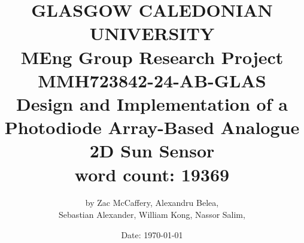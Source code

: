\title{
    {\LARGE\textbf{GLASGOW CALEDONIAN UNIVERSITY}} \\
    \vspace{1.5cm}
    {\LARGE MEng Group Research Project } \\
    \vspace{0.5cm}
    {\LARGE MMH723842-24-AB-GLAS} \\
    \vspace{1.5cm}
    {\LARGE\textbf{Design and Implementation of a Photodiode Array-Based Analogue 2D Sun Sensor}} \\
    \vspace{0.5cm}
    {\large word count: 19369} \\
}

\author{
    by Zac McCaffery, Alexandru Belea,  \\
    Sebastian Alexander, William Kong, Nassor Salim,
}

\date{
    Date: \today
}
